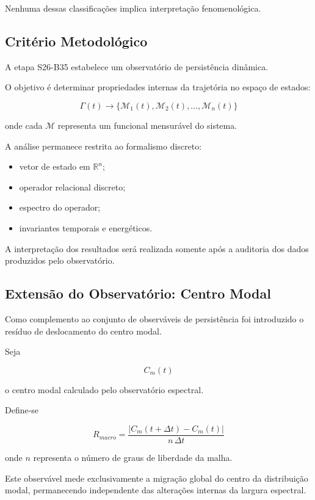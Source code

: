 \documentclass[11pt,a4paper]{article}
\begin{document}
Nenhuma dessas classificações implica interpretação fenomenológica.


\subsection{Critério Metodológico}

A etapa S26-B35 estabelece um observatório de persistência dinâmica.

O objetivo é determinar propriedades internas da trajetória no espaço
de estados:

\[
\Gamma(t)
\rightarrow
\{\mathcal{M}_1(t),
\mathcal{M}_2(t),
...,
\mathcal{M}_n(t)\}
\]

onde cada $\mathcal{M}$ representa um funcional mensurável do sistema.

A análise permanece restrita ao formalismo discreto:

\begin{itemize}
    \item vetor de estado em $\mathbb{R}^{n}$;
    \item operador relacional discreto;
    \item espectro do operador;
    \item invariantes temporais e energéticos.
\end{itemize}

A interpretação dos resultados será realizada somente após a auditoria
dos dados produzidos pelo observatório.

\subsection{Extensão do Observatório: Centro Modal}

Como complemento ao conjunto de observáveis de persistência foi
introduzido o resíduo de deslocamento do centro modal.

Seja

\[
C_m(t)
\]

o centro modal calculado pelo observatório espectral.

Define-se

\[
R_{macro}
=
\frac{
|C_m(t+\Delta t)-C_m(t)|
}{
n\,\Delta t
}
\]

onde \(n\) representa o número de graus de liberdade da malha.

Este observável mede exclusivamente a migração global do centro da
distribuição modal, permanecendo independente das alterações internas da
largura espectral.
\end{document}
